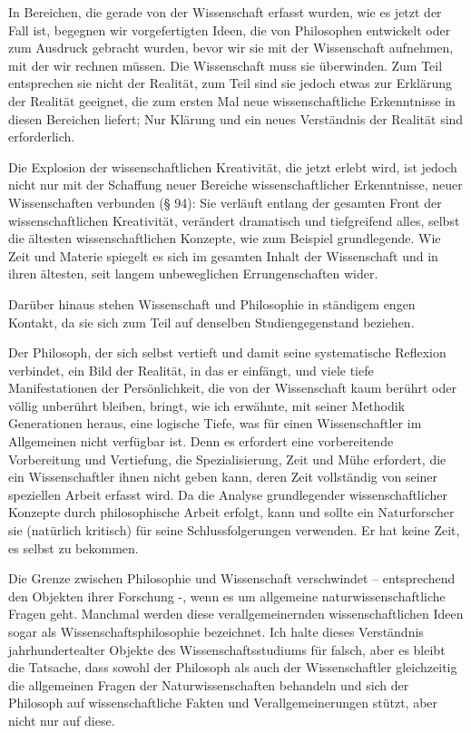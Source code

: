 \documentclass[11pt,a4paper]{book}
\begin{document}
In Bereichen, die gerade von der Wissenschaft erfasst wurden, wie es jetzt der Fall ist, begegnen wir vorgefertigten Ideen, die von Philosophen entwickelt oder zum Ausdruck gebracht wurden, bevor wir sie mit der Wissenschaft aufnehmen, mit der wir rechnen müssen. Die Wissenschaft muss sie überwinden. Zum Teil entsprechen sie nicht der Realität, zum Teil sind sie jedoch etwas zur Erklärung der Realität geeignet, die zum ersten Mal neue wissenschaftliche Erkenntnisse in diesen Bereichen liefert; Nur Klärung und ein neues Verständnis der Realität sind erforderlich.



Die Explosion der wissenschaftlichen Kreativität, die jetzt erlebt wird, ist jedoch nicht nur mit der Schaffung neuer Bereiche wissenschaftlicher Erkenntnisse, neuer Wissenschaften verbunden (§ 94): Sie verläuft entlang der gesamten Front der wissenschaftlichen Kreativität, verändert dramatisch und tiefgreifend alles, selbst die ältesten wissenschaftlichen Konzepte, wie zum Beispiel grundlegende. Wie Zeit und Materie spiegelt es sich im gesamten Inhalt der Wissenschaft und in ihren ältesten, seit langem unbeweglichen Errungenschaften wider.



Darüber hinaus stehen Wissenschaft und Philosophie in ständigem engen Kontakt, da sie sich zum Teil auf denselben Studiengegenstand beziehen.



Der Philosoph, der sich selbst vertieft und damit seine systematische Reflexion verbindet, ein Bild der Realität, in das er einfängt, und viele tiefe Manifestationen der Persönlichkeit, die von der Wissenschaft kaum berührt oder völlig unberührt bleiben, bringt, wie ich erwähnte, mit seiner Methodik Generationen heraus, eine logische Tiefe, was für einen Wissenschaftler im Allgemeinen nicht verfügbar ist. Denn es erfordert eine vorbereitende Vorbereitung und Vertiefung, die Spezialisierung, Zeit und Mühe erfordert, die ein Wissenschaftler ihnen nicht geben kann, deren Zeit vollständig von seiner speziellen Arbeit erfasst wird. Da die Analyse grundlegender wissenschaftlicher Konzepte durch philosophische Arbeit erfolgt, kann und sollte ein Naturforscher sie (natürlich kritisch) für seine Schlussfolgerungen verwenden. Er hat keine Zeit, es selbst zu bekommen.



Die Grenze zwischen Philosophie und Wissenschaft verschwindet -- entsprechend den Objekten ihrer Forschung -, wenn es um allgemeine naturwissenschaftliche Fragen geht. Manchmal werden diese verallgemeinernden wissenschaftlichen Ideen sogar als Wissenschaftsphilosophie bezeichnet. Ich halte dieses Verständnis jahrhundertealter Objekte des Wissenschaftsstudiums für falsch, aber es bleibt die Tatsache, dass sowohl der Philosoph als auch der Wissenschaftler gleichzeitig die allgemeinen Fragen der Naturwissenschaften behandeln und sich der Philosoph auf wissenschaftliche Fakten und Verallgemeinerungen stützt, aber nicht nur auf diese.
\end{document}
